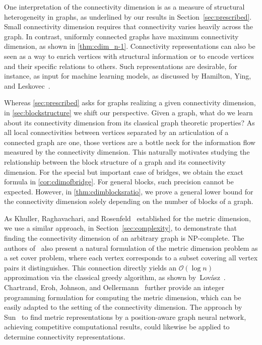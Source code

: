 \documentclass[letterpaper,12pt,headings=normal,parskip=half]{scrartcl}
\theoremstyle{definition}
\begin{document}
One interpretation of the connectivity dimension is as a measure of structural heterogeneity in graphs, as underlined by our results in Section~\ref{sec:prescribed}. 
Small connectivity dimension requires that connectivity varies heavily across the graph. In contrast, uniformly connected graphs have maximum connectivity dimension, as shown in \cref{thm:cdim_n-1}. Connectivity representations can also be seen as a way to enrich vertices with structural information or to encode vertices and their specific relations to others. 
Such representations are desirable, for instance, as input for machine learning models, as discussed by Hamilton, Ying, and Leskovec~\cite{hamilton2017representation}.

Whereas \cref{sec:prescribed} asks for graphs realizing a given connectivity dimension, in \cref{sec:blockstructure} we shift our perspective. 
Given a graph, what do we learn about its connectivity dimension from its classical graph theoretic properties?
As all local connectivities between vertices separated by an articulation of a connected graph are one, those vertices are a bottle neck for the information flow measured by the connectivity dimension.
This naturally motivates studying the relationship between the block structure of a graph and its connectivity dimension.
For the special but important case of bridges, we obtain the exact formula in \cref{cor:cdimofbridge}.
For general blocks, such precision cannot be expected.
However, in \cref{thm:cdimblocksratio}, we prove a general lower bound for the connectivity dimension solely depending on the number of blocks of a graph.

As Khuller, Raghavachari, and Rosenfeld~\cite{khuller1996landmarks} established for the metric dimension, we use a similar approach, in Section~\ref{sec:complexity}, to demonstrate that finding the connectivity dimension of an arbitrary graph is NP-complete. The authors of~\cite{khuller1996landmarks} also present a natural formulation of the metric dimension problem as a set cover problem, where each vertex corresponds to a subset covering all vertex pairs it distinguishes. This connection directly yields an $\mathcal{O}(\log n)$ approximation via the classical greedy algorithm, as shown by~Lov{\'a}sz~\cite{lovasz1975ratio}. Chartrand, Eroh, Johnson, and Oellermann~\cite{chartrand2000resolvability} further provide an integer programming formulation for computing the metric dimension, which can be easily adapted to the setting of the connectivity dimension. The approach by Sun~\cite{sun2023pp} to find metric representations by a position-aware graph neural network, achieving competitive computational results, could likewise be applied to determine connectivity representations.
\end{document}
